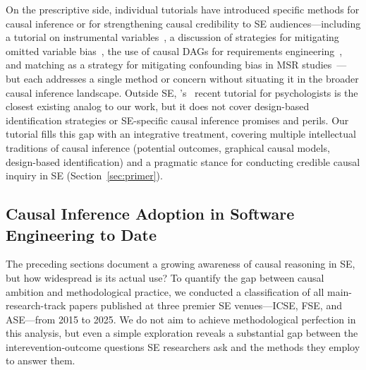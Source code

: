 On the prescriptive side, individual tutorials have introduced specific methods for causal inference or for strengthening causal credibility to SE audiences---including a tutorial on instrumental variables~\cite{DBLP:journals/tosem/GrafVlachyW24}, a discussion of strategies for mitigating omitted variable bias~\cite{DBLP:journals/corr/abs-2501-17026}, the use of causal DAGs for requirements engineering~\cite{DBLP:journals/corr/abs-2511-03875}, and matching as a strategy for mitigating confounding bias in MSR studies~\cite{DBLP:conf/msr/NoceraSLTV26}---but each addresses a single method or concern without situating it in the broader causal inference landscape.
Outside SE, \citeauthor{rohrer2024causal}'s~\cite{rohrer2024causal} recent tutorial for psychologists is the closest existing analog to our work, but it does not cover design-based identification strategies or SE-specific causal inference promises and perils.
Our tutorial fills this gap with an integrative treatment, covering multiple intellectual traditions of causal inference (potential outcomes, graphical causal models, design-based identification) and a pragmatic stance for conducting credible causal inquiry in SE (Section~\ref{sec:primer}).

\subsection{Causal Inference Adoption in Software Engineering to Date}
\label{sec:bg-adoption}

The preceding sections document a growing awareness of causal reasoning in SE, but how widespread is its actual use?
To quantify the gap between causal ambition and methodological practice, we conducted a classification of all main-research-track papers published at three premier SE venues---ICSE, FSE, and ASE---from 2015 to 2025.
We do not aim to achieve methodological perfection in this analysis, but even a simple exploration reveals a substantial gap between the interevention-outcome questions SE researchers ask and the methods they employ to answer them.

